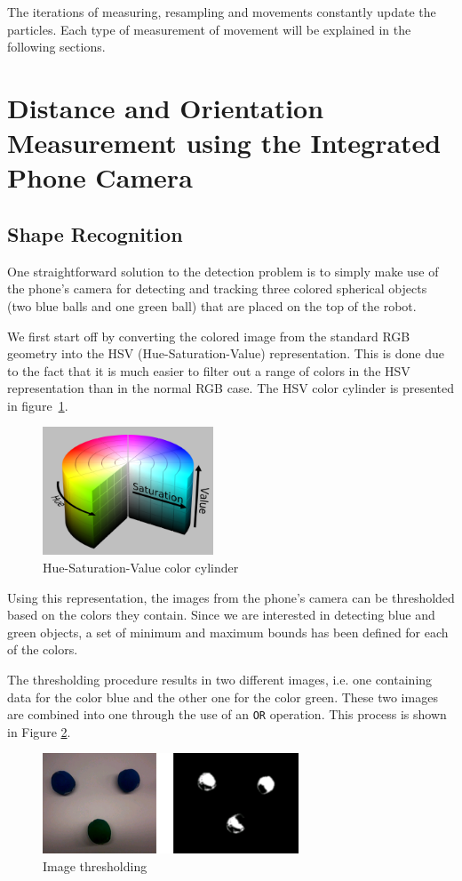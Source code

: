\documentclass[journal]{IEEEtran}
\let\MYoriglatexcaption\caption
\renewcommand{\caption}[2][\relax]{\MYoriglatexcaption[#2]{#2}}
\begin{document}
The iterations of measuring, resampling and movements constantly update the
particles. Each type of measurement of movement will be explained in the
following sections.

\section{Distance and Orientation Measurement using the Integrated Phone Camera}


\subsection{Shape Recognition}

One straightforward solution to the detection problem is to simply make use of
the phone's camera for detecting and tracking three colored spherical objects
(two blue balls and one green ball) that are placed on the top of the robot.

We first start off by converting the colored image from the standard RGB geometry into the HSV (Hue-Saturation-Value) representation. This is done due to the fact that it is much easier to filter out a range of colors in the HSV representation than in the normal RGB case. The HSV color cylinder is presented in figure~\ref{fig:sim}.

\begin{figure}[!htpb]
\centering
\includegraphics[width=2in]{images/hsv_representation}
\caption{Hue-Saturation-Value color cylinder}
\label{fig:sim}
\end{figure}

Using this representation, the images from the phone's camera can be thresholded based on the colors they contain. Since we are interested in detecting blue and green objects, a set of minimum and maximum bounds has been defined for each of the colors.

The thresholding procedure results in two different images, i.e. one containing data for the color blue and the other one for the color green. These two images are combined into one through the use of an \texttt{OR} operation. This process is shown in Figure \ref{fig:thresh}.
\begin{figure}[!htpb]
\centering
\includegraphics[width=3in]{images/thresholding}
\caption{Image thresholding}
\label{fig:thresh}
\end{figure}
\end{document}
